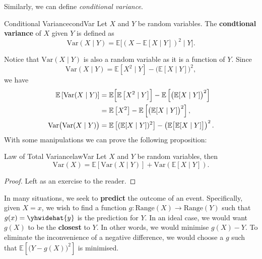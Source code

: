 \documentclass[math]{amznotes}
\theoremstyle{remark}
\newcommand{\0}{\mathbf{0}}
\newcommand{\1}{\mathbf{1}}
\begin{document}
Similarly, we can define \textit{conditional variance}.
\begin{dfnbox}{Conditional Variance}{condVar}
    Let $X$ and $Y$ be random variables. The {\color{red} \textbf{condtional variance}} of $X$ given $Y$ is defined as
    \begin{equation*}
        \mathrm{Var}(X \mid Y) = \mathbb{E}\bigl[(X - \mathbb{E}[X \mid Y])^2 \mid Y\bigr].
    \end{equation*}
\end{dfnbox}
Notice that $\mathrm{Var}(X \mid Y)$ is also a random variable as it is a function of $Y$. Since 
\begin{equation*}
    \mathrm{Var}(X \mid Y) = \mathbb{E}\left[X^2 \mid Y\right] - \bigl(\mathbb{E}[X \mid Y]\bigr)^2,
\end{equation*}
we have
\begin{align*}
    \mathbb{E}\left[\mathrm{Var}(X \mid Y)\right] & = \mathbb{E}\Bigl[\mathbb{E}\left[X^2 \mid Y\right]\Bigr] - \mathbb{E}\left[\bigl(\mathbb{E}[X \mid Y]\bigr)^2\right] \\
    & = \mathbb{E}\left[X^2\right] - \mathbb{E}\left[\bigl(\mathbb{E}[X \mid Y]\bigr)^2\right], \\
    \mathrm{Var}\bigl(\mathrm{Var}(X \mid Y)\bigr) & = \mathbb{E}\left[(\mathbb{E}[X \mid Y])^2\right] - \left(\mathbb{E}\bigl[\mathbb{E}[X \mid Y]\bigr]\right)^2.
\end{align*}
With some manipulations we can prove the following proposition:
\begin{thmbox}{Law of Total Variance}{lawVar}
    Let $X$ and $Y$ be random variables, then
    \begin{equation*}
        \mathrm{Var}(X) = \mathbb{E}[\mathrm{Var}(X \mid Y)] + \mathrm{Var}(\mathbb{E}[X \mid Y]).
    \end{equation*}
    \tcblower
    \begin{proof}
        Left as an exercise to the reader.
    \end{proof}
\end{thmbox}
In many situations, we seek to \textbf{predict} the outcome of an event. Specifically, given $X = x$, we wish to find a function $g \colon \mathrm{Range}(X) \to \mathrm{Range}(Y)$ such that $g(x) = \yhwidehat{y}$ is the prediction for $Y$. In an ideal case, we would want $g(X)$ to be the \textbf{closest} to $Y$. In other words, we would minimise $g(X) - Y$. To eliminate the inconvenience of a negative difference, we would choose a $g$ such that $\mathbb{E}\left[\bigl(Y - g(X)\bigr)^2\right]$ is minimised.
\end{document}
